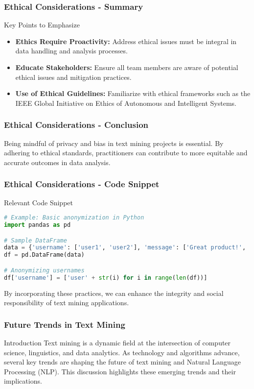 \documentclass[aspectratio=169]{beamer}
\begin{document}
\begin{frame}[fragile]
  \frametitle{Ethical Considerations - Summary}
  \begin{block}{Key Points to Emphasize}
    \begin{itemize}
        \item \textbf{Ethics Require Proactivity:} Address ethical issues must be integral in data handling and analysis processes.
        \item \textbf{Educate Stakeholders:} Ensure all team members are aware of potential ethical issues and mitigation practices.
        \item \textbf{Use of Ethical Guidelines:} Familiarize with ethical frameworks such as the IEEE Global Initiative on Ethics of Autonomous and Intelligent Systems.
    \end{itemize}
  \end{block}
\end{frame}

\begin{frame}[fragile]
  \frametitle{Ethical Considerations - Conclusion}
  Being mindful of privacy and bias in text mining projects is essential. By adhering to ethical standards, practitioners can contribute to more equitable and accurate outcomes in data analysis.
\end{frame}

\begin{frame}[fragile]
  \frametitle{Ethical Considerations - Code Snippet}
  \begin{block}{Relevant Code Snippet}
    \begin{lstlisting}[language=Python]
# Example: Basic anonymization in Python
import pandas as pd

# Sample DataFrame
data = {'username': ['user1', 'user2'], 'message': ['Great product!', 'Not what I expected.']}
df = pd.DataFrame(data)

# Anonymizing usernames
df['username'] = ['user' + str(i) for i in range(len(df))]
    \end{lstlisting}
  \end{block}
  By incorporating these practices, we can enhance the integrity and social responsibility of text mining applications.
\end{frame}

\begin{frame}[fragile]
  \frametitle{Future Trends in Text Mining}
  \begin{block}{Introduction}
    Text mining is a dynamic field at the intersection of computer science, linguistics, and data analytics. As technology and algorithms advance, several key trends are shaping the future of text mining and Natural Language Processing (NLP). This discussion highlights these emerging trends and their implications.
  \end{block}
\end{frame}
\end{document}
